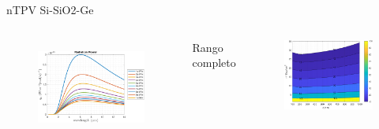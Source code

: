 \documentclass[spanish,a4paper]{beamer}%
\begin{document}
\begin{frame}{nTPV Si-SiO2-Ge}
{\begin{columns}
\begin{minipage}[l]{.1\columnwidth}
					\end{minipage}\hfill
					\begin{minipage}[r]{.9\columnwidth}
						\begin{figure}[h]%
								\flushright
										\includegraphics[width=0.8\columnwidth]{SiGe}
								\label{fig:SiSiO2Ge_rel}%
						\end{figure}
						\end{minipage}\hfill \vfill
						\begin{minipage}[l]{.1\columnwidth}
							\begin{turn}{90}
							\begin{minipage}[t]{80pt}
								\begin{block}{\centering Rango completo}
								\end{block}
							\end{minipage}
							\end{turn}
					\end{minipage}\hfill
					\begin{minipage}[r]{.9\columnwidth}
						\begin{figure}[h]%
								\flushright
										\includegraphics[width=0.8\columnwidth]{SiGe_full}

\end{figure}
\end{minipage}
\end{columns}}
\end{frame}
\end{document}
